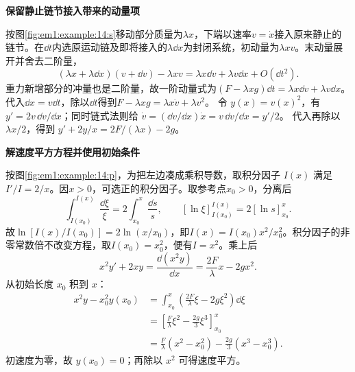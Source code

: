 \begin{solution}\textbf{保留静止链节接入带来的动量项}\par\nobreak
按图\ref{fig:em1:example:14:s}移动部分质量为$\lambda x$，下端以速率$v=\dot x$接入原来静止的链节。在$\dd t$内选原运动链及即将接入的$\lambda\dd x$为封闭系统，初动量为$\lambda xv$。末动量展开并舍去二阶量，
\[
(\lambda x+\lambda\dd x)(v+\dd v)-\lambda xv
=\lambda x\dd v+\lambda v\dd x+O(\dd t^2).
\]
重力新增部分的冲量也是二阶量，故一阶动量式为$(F-\lambda xg)\dd t=\lambda x\dd v+\lambda v\dd x$。代入$\dd x=v\dd t$，除以$\dd t$得到$F-\lambda xg=\lambda x\dot v+\lambda v^2$。
令 $y(x)=v(x)^2$，有 $y'=2v\,\dd v/\dd x$；同时链式法则给
$\dot v=(\dd v/\dd x)\dot x=v\,\dd v/\dd x=y'/2$。
代入再除以 $\lambda x/2$，得到 $y'+2y/x=2F/(\lambda x)-2g$。



\par\medskip{}\noindent\textbf{解速度平方方程并使用初始条件}\par\nobreak
按图\ref{fig:em1:example:14:p}，为把左边凑成乘积导数，取积分因子 $I(x)$ 满足 $I'/I=2/x$。因$x>0$，可选正的积分因子。取参考点$x_0>0$，分离后
\[
\int_{I(x_0)}^{I(x)}\frac{\dd \xi}{\xi}
=2\int_{x_0}^{x}\frac{\dd s}{s},
\qquad
[\ln\xi]_{I(x_0)}^{I(x)}=2[\ln s]_{x_0}^{x}.
\]
故$\ln[I(x)/I(x_0)]=2\ln(x/x_0)$，即$I(x)=I(x_0)x^2/x_0^2$。积分因子的非零常数倍不改变方程，取$I(x_0)=x_0^2$，便有$I=x^2$。乘上后
\[
x^2y'+2xy=\frac{\dd(x^2y)}{\dd x}=\frac{2F}{\lambda}x-2gx^2.
\]
从初始长度 $x_0$ 积到 $x$：
\begin{align*}
x^2y-x_0^2y(x_0)
&=\int_{x_0}^x\left(\frac{2F}{\lambda}\xi-2g\xi^2\right)\dd\xi\\
&=\left[\frac F\lambda\xi^2-\frac{2g}{3}\xi^3\right]_{x_0}^x\\
&=\frac F\lambda(x^2-x_0^2)-\frac{2g}{3}(x^3-x_0^3).
\end{align*}
初速度为零，故 $y(x_0)=0$；再除以 $x^2$ 可得速度平方。


\end{solution}
